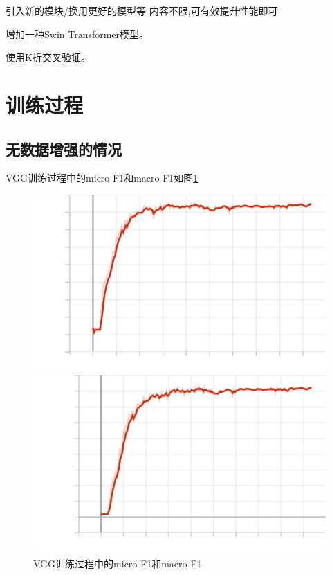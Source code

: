 \documentclass{article}
\begin{document}
引入新的模块/换用更好的模型等
内容不限,可有效提升性能即可

增加一种Swin Transformer模型\cite{liu2021swin}。

使用K折交叉验证。


\section{训练过程}

\subsection{无数据增强的情况}

VGG训练过程中的micro F1和macro F1如图\ref{VGG-f1s}

\begin{figure}[H]
    \begin{minipage}[H]{0.5\linewidth}
        \centering
        \includegraphics[width=\textwidth]{figures/vgg_noaug_microf1score_dev.png}
    \end{minipage}
    \begin{minipage}[H]{0.5\linewidth}
        \centering
        \includegraphics[width=\textwidth]{figures/vgg_noaug_macrof1score_dev.png}
    \end{minipage}
    \caption{VGG训练过程中的micro F1和macro F1}
    \label{VGG-f1s}
\end{figure}
\end{document}
